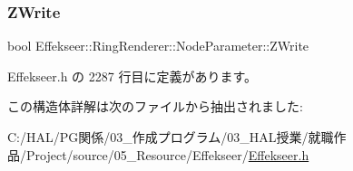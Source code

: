 \subsubsection{\texorpdfstring{Z\+Write}{ZWrite}}
{\footnotesize\ttfamily bool Effekseer\+::\+Ring\+Renderer\+::\+Node\+Parameter\+::\+Z\+Write}



 Effekseer.\+h の 2287 行目に定義があります。



この構造体詳解は次のファイルから抽出されました\+:\begin{DoxyCompactItemize}
\item 
C\+:/\+H\+A\+L/\+P\+G関係/03\+\_\+作成プログラム/03\+\_\+\+H\+A\+L授業/就職作品/\+Project/source/05\+\_\+\+Resource/\+Effekseer/\mbox{\hyperlink{_effekseer_8h}{Effekseer.\+h}}\end{DoxyCompactItemize}
